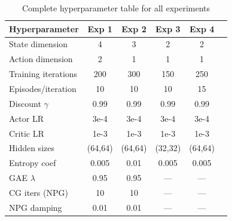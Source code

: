 \documentclass[11pt, a4paper]{article}
\begin{document}
\begin{table}[h]
\centering
\caption{Complete hyperparameter table for all experiments}
\begin{tabular}{lccccc}
\toprule
\textbf{Hyperparameter} & \textbf{Exp 1} & \textbf{Exp 2} & \textbf{Exp 3} & \textbf{Exp 4} \\
\midrule
State dimension     & 4     & 3     & 2     & 2 \\
Action dimension    & 2     & 1     & 1     & 1 \\
Training iterations & 200   & 300   & 150   & 250 \\
Episodes/iteration  & 10    & 10    & 10    & 15 \\
Discount $\gamma$   & 0.99  & 0.99  & 0.99  & 0.99 \\
Actor LR            & 3e-4  & 3e-4  & 3e-4  & 3e-4 \\
Critic LR           & 1e-3  & 1e-3  & 1e-3  & 1e-3 \\
Hidden sizes        & (64,64) & (64,64) & (32,32) & (64,64) \\
Entropy coef        & 0.005 & 0.01  & 0.005 & 0.005 \\
GAE $\lambda$       & 0.95  & 0.95  & ---   & --- \\
CG iters (NPG)      & 10    & 10    & ---   & --- \\
NPG damping         & 0.01  & 0.01  & ---   & --- \\
\bottomrule
\end{tabular}
\end{table}
\end{document}
